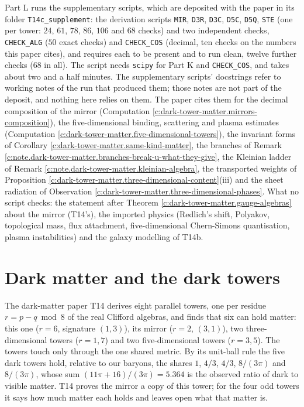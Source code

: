 \documentclass[11pt]{article}
\theoremstyle{definition}
\theoremstyle{plain}
\providecommand{\file}{}\renewcommand{\file}[1]{\texttt{#1}}
\begin{document}
Part L runs the supplementary scripts, which are deposited with the paper in its folder \file{T14c\_supplement}: the derivation scripts \file{MIR}, \file{D3R}, \file{D3C}, \file{D5C}, \file{D5Q}, \file{STE} (one per tower: $24$, $61$, $78$, $86$, $106$ and $68$ checks) and two independent checks, \file{CHECK\_ALG} ($50$ exact checks) and \file{CHECK\_COS} (decimal, ten checks on the numbers this paper cites), and requires each to be present and to run clean, twelve further checks ($68$ in all). The script needs \texttt{scipy} for Part K and \file{CHECK\_COS}, and takes about two and a half minutes. The supplementary scripts' docstrings refer to working notes of the run that produced them; those notes are not part of the deposit, and nothing here relies on them. The paper cites them for the decimal composition of the mirror (Computation \ref{c:dark-tower-matter.mirrors-composition}), the five-dimensional binding, scattering and plasma estimates (Computation \ref{c:dark-tower-matter.five-dimensional-towers}), the invariant forms of Corollary \ref{c:dark-tower-matter.same-kind-matter}, the branches of Remark \ref{c:note.dark-tower-matter.branches-break-u-what-they-give}, the Kleinian ladder of Remark \ref{c:note.dark-tower-matter.kleinian-algebra}, the transported weights of Proposition \ref{c:dark-tower-matter.three-dimensional-content}(iii) and the sheet radiation of Observation \ref{c:dark-tower-matter.three-dimensional-phases}. What no script checks: the statement after Theorem \ref{c:dark-tower-matter.gauge-algebras} about the mirror (T14's), the imported physics (Redlich's shift, Polyakov, topological mass, flux attachment, five-dimensional Chern-Simons quantisation, plasma instabilities) and the galaxy modelling of T14b.

\section{Dark matter and the dark towers}

\label{c:note.dark-tower-matter.setting-introduction}
The dark-matter paper T14 \cite{ButlerT14} derives eight parallel towers, one per residue $r = p - q \bmod 8$ of the real Clifford algebras, and finds that six can hold matter: this one ($r = 6$, signature $(1,3)$), its mirror ($r = 2$, $(3,1)$), two three-dimensional towers ($r = 1, 7$) and two five-dimensional towers ($r = 3, 5$). The towers touch only through the one shared metric. By its unit-ball rule the five dark towers hold, relative to our baryons, the shares $1$, $4/3$, $4/3$, $8/(3\pi)$ and $8/(3\pi)$, whose sum $(11\pi + 16)/(3\pi) = 5.364$ is the observed ratio of dark to visible matter. T14 proves the mirror a copy of this tower; for the four odd towers it says how much matter each holds and leaves open what that matter is.
\end{document}
